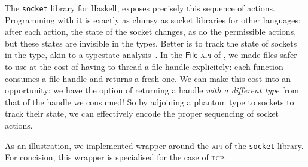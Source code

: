 \documentclass[acmsmall,screen]{acmart}\settopmatter{}
\newcommand{\Conid}[1]{\mathit{#1}}
\renewcommand\Conid[1]{\mathord{\textsf{#1}}}
\begin{document}
The \texttt{socket} library for Haskell, exposes precisely this sequence of
actions.
%
Programming with it is exactly as clumsy as socket libraries for other
languages: after each action, the state of the socket changes, as do the
permissible actions, but these states are invisible in the types.
%
Better is to track the state of sockets in the type, akin to a typestate
analysis~\cite{strom_typestate_1983}.
%
In the \ensuremath{\Conid{File}} \textsc{api} of , we made files
safer to use at the cost of having to thread a file handle
explicitely: each function consumes a file handle and returns a fresh
one. We can make this cost into an opportunity: we have the option of
returning a handle \emph{with a different type} from that of the
handle we consumed! So by adjoining a phantom type to sockets to track
their state, we can effectively encode the proper sequencing of socket
actions.

As an illustration, we implemented wrapper around the \textsc{api} of the
\texttt{socket} library. For concision, this wrapper is
specialised for the case of \textsc{tcp}.
\end{document}
